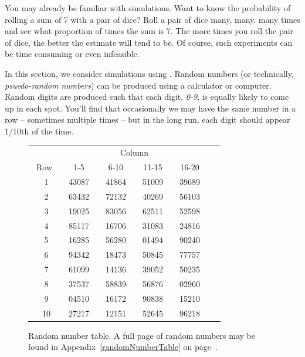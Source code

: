 You may already be familiar with simulations. Want to know the probability of rolling a sum of 7 with a pair of dice?  Roll a pair of dice many, many, many times and see what proportion of times the sum is 7. The more times you roll the pair of dice, the better the estimate will tend to be. Of course, such experiments can be time consuming or even infeasible.

In this section, we consider simulations using . Random numbers (or technically, \emph{psuedo-random numbers}) can be produced using a calculator or computer. Random digits are produced such that each digit, \emph{0-9}, is equally likely to come up in each spot. You'll find that occasionally we may have the same number in a row -- sometimes multiple times -- but in the long run, each digit should appear 1/10th of the time.

\begin{figure}[h]
\centering
\begin{tabular}{cc cc cc cc cc}
& \multicolumn{7}{c}{Column} \\
  \cline{2-8}
\quad\ Row\quad\ \  & 1-5 && 6-10 && 11-15 && 16-20 \\
  \hline
1 & 43087 & \quad & 41864 & \quad & 51009 & \quad & 39689 \\
2 & 63432 & \quad & 72132 & \quad & 40269 & \quad & 56103 \\
3 & 19025 & \quad & 83056 & \quad & 62511 & \quad & 52598 \\
4 & 85117 & \quad & 16706 & \quad & 31083 & \quad & 24816 \\
5 & 16285 & \quad & 56280 & \quad & 01494 & \quad & 90240 \\
  \hline
6 & 94342 & \quad & 18473 & \quad & 50845 & \quad & 77757 \\
7 & 61099 & \quad & 14136 & \quad & 39052 & \quad & 50235 \\
8 & 37537 & \quad & 58839 & \quad & 56876 & \quad & 02960 \\
9 & 04510 & \quad & 16172 & \quad & 90838 & \quad & 15210 \\
10 & 27217 & \quad & 12151 & \quad & 52645 & \quad & 96218 \\
  \hline
\end{tabular}
\caption{Random number table. A full page of random numbers may be found in Appendix~\ref{randomNumberTable} on page~\pageref{randomNumberTable}.}
\label{sampleRandomNumberTable}
\end{figure}


